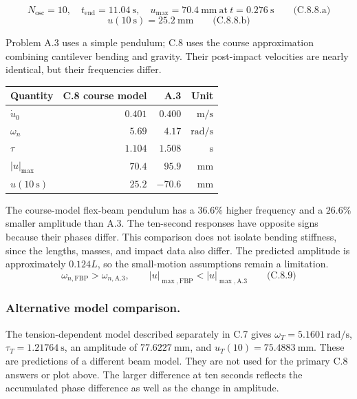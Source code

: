 \[
\boxed{N_{\mathrm{osc}}=10,\quad t_{\mathrm{end}}=11.04\ \mathrm{s},\quad
u_{\max}=70.4\ \mathrm{mm}\ \text{at}\ t=0.276\ \mathrm{s}}
\qquad\text{(C.8.8.a)}
\]
\[
\boxed{u(10\ \mathrm{s})=25.2\ \mathrm{mm}}
\qquad\text{(C.8.8.b)}
\]

Problem A.3 uses a simple pendulum; C.8 uses the course approximation combining cantilever bending and gravity. Their post-impact velocities are nearly identical, but their frequencies differ.

\begin{center}\small
\begin{tabular}{@{}lrrr@{}}
\toprule
Quantity & C.8 course model & A.3 & Unit \\
\midrule
\(\dot u_0\) & \(0.401\) & \(0.400\) & \(\mathrm{m/s}\) \\
\(\omega_n\) & \(5.69\) & \(4.17\) & \(\mathrm{rad/s}\) \\
\(\tau\) & \(1.104\) & \(1.508\) & \(\mathrm{s}\) \\
\(\lvert u\rvert_{\max}\) & \(70.4\) & \(95.9\) & \(\mathrm{mm}\) \\
\(u(10\ \mathrm{s})\) & \(25.2\) & \(-70.6\) & \(\mathrm{mm}\) \\
\bottomrule
\end{tabular}
\end{center}
The course-model flex-beam pendulum has a \(36.6\%\) higher frequency and a \(26.6\%\) smaller amplitude than A.3. The ten-second responses have opposite signs because their phases differ. This comparison does not isolate bending stiffness, since the lengths, masses, and impact data also differ. The predicted amplitude is approximately \(0.124L\), so the small-motion assumptions remain a limitation.
\[
\boxed{\omega_{n,\mathrm{FBP}}>\omega_{n,\mathrm{A.3}},\qquad
\lvert u\rvert_{\max,\mathrm{FBP}}<\lvert u\rvert_{\max,\mathrm{A.3}}}
\qquad\text{(C.8.9)}
\]

\subsubsection*{Alternative model comparison.}
The tension-dependent model described separately in C.7 gives \(\omega_T=5.1601\ \mathrm{rad/s}\), \(\tau_T=1.21764\ \mathrm{s}\), an amplitude of \(77.6227\ \mathrm{mm}\), and \(u_T(10)=75.4883\ \mathrm{mm}\). These are predictions of a different beam model. They are not used for the primary C.8 answers or plot above. The larger difference at ten seconds reflects the accumulated phase difference as well as the change in amplitude.


